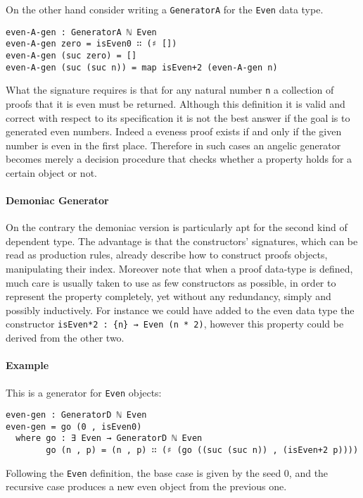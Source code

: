 \documentclass[10pt,a4paper]{article}
\begin{document}
On the other hand consider writing a \texttt{GeneratorA} for the \texttt{Even} data type.
\begin{verbatim}
even-A-gen : GeneratorA ℕ Even
even-A-gen zero = isEven0 ∷ (♯ [])
even-A-gen (suc zero) = []
even-A-gen (suc (suc n)) = map isEven+2 (even-A-gen n)
\end{verbatim}
What the signature requires is that for any natural number \texttt{n} a collection of proofs that it is even must be returned.
Although this definition it is valid and correct with respect to its specification
it is not the best answer if the goal is to generated even numbers.
Indeed a eveness proof exists if and only if the given number is even in the first place. Therefore in such cases an angelic generator becomes merely a decision procedure that checks whether a property holds for a certain object or not.

\paragraph{Demoniac Generator}
On the contrary the demoniac version is particularly apt for the second kind of dependent type. The advantage is that the constructors' signatures, which can be read as production rules, already describe how to construct proofs objects, manipulating their index.
Moreover note that when a proof data-type is defined, much care is usually taken to use as few constructors as possible, in order to represent the property completely, yet without any redundancy, simply and possibly inductively. For instance we could have added to the even data type the constructor \texttt{isEven*2 :\ \{n\} → Even (n * 2)}, however this property could be derived from the other two.

\paragraph{Example}
This is a generator for \texttt{Even} objects:
\begin{verbatim}
even-gen : GeneratorD ℕ Even
even-gen = go (0 , isEven0)
  where go : ∃ Even → GeneratorD ℕ Even
        go (n , p) = (n , p) ∷ (♯ (go ((suc (suc n)) , (isEven+2 p))))
\end{verbatim}
Following the \texttt{Even} definition, the base case is given by the seed 0, and the recursive case produces a new even object from the previous one.
\end{document}
